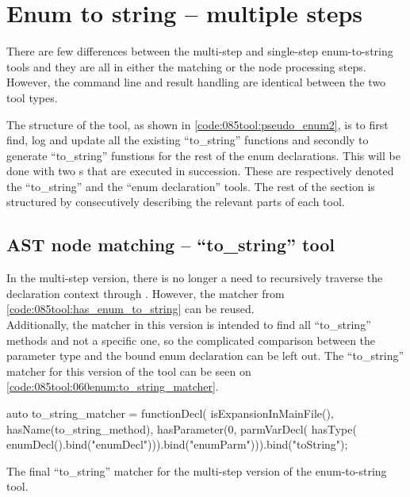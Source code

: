 \section{Enum to string -- multiple steps}

There are few differences between the multi-step and single-step enum-to-string tools and they are all in either the matching or the node processing steps. However, the command line and result handling are identical between the two tool types.

The structure of the tool, as shown in \cref{code:085tool:pseudo_enum2}, is to first find, log and update all the existing ``to\_string'' functions and secondly to generate ``to\_string'' funstions for the rest of the enum declarations.
This will be done with two s that are executed in succession. These are respectively denoted the ``to\_string'' and the ``enum declaration'' tools. The rest of the section is structured by consecutively describing the relevant parts of each tool.

\subsection{AST node matching -- ``to\_string'' tool}
In the multi-step version, there is no longer a need to recursively traverse the declaration context through .
However, the  matcher from \cref{code:085tool:has_enum_to_string} can be reused.\\
Additionally, the matcher in this version is intended to find all ``to\_string'' methods and not a specific one, so the complicated comparison between the parameter type and the bound enum declaration can be left out.
The ``to\_string'' matcher for this version of the tool can be seen on \cref{code:085tool:060enum:to_string_matcher}.

\begin{listing}[H]
    \begin{cppcode}
auto to_string_matcher = functionDecl(
  isExpansionInMainFile(),
  hasName(to_string_method),
  hasParameter(0, 
    parmVarDecl(
	  hasType(
	    enumDecl().bind("enumDecl"))).bind("enumParm"))).bind("toString");
    \end{cppcode}
    \caption{The final ``to\_string'' matcher for the multi-step version of the enum-to-string tool.}
    \label{code:085tool:060enum:to_string_matcher}
\end{listing}

